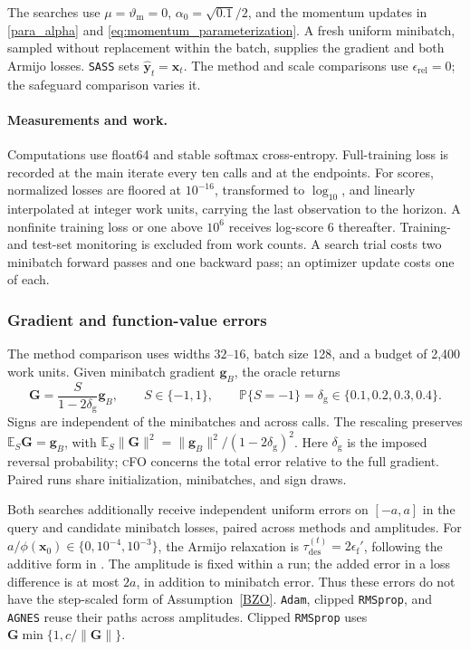 \documentclass{article}
\begin{document}
The searches use \(\mu=\vartheta_{\mathrm m}=0\),
\(\alpha_0=\sqrt{0.1}/2\), and the momentum updates in
\eqref{para_alpha} and \eqref{eq:momentum_parameterization}.
A fresh uniform minibatch, sampled without replacement within the
batch, supplies the gradient and both Armijo losses. \texttt{SASS} sets \(\hat{\bm y}_t=\bm x_t\). The method and scale comparisons
use \(\epsilon_{\mathrm{rel}}=0\); the safeguard comparison varies it.

\paragraph{Measurements and work.}
Computations use float64 and stable softmax cross-entropy.
Full-training loss is recorded at the main iterate every ten calls
and at the endpoints. For scores, normalized losses are floored at
\(10^{-16}\), transformed to \(\log_{10}\), and linearly interpolated
at integer work units, carrying the last observation to the horizon.
A nonfinite training loss or one above \(10^6\) receives log-score 6
thereafter. Training- and test-set monitoring is excluded from work
counts. A search trial costs two minibatch forward passes and one
backward pass; an optimizer update costs one of each.

\subsubsection{Gradient and function-value errors}
\label{app:exp_nn_comparison}

The method comparison uses widths \(32\)--\(16\), batch size 128,
and a budget of 2,400 work units. Given minibatch gradient \(\bm g_B\),
the oracle returns
\begin{equation}\label{eq:exp_nn_flip}
\mathbf G=\frac{S}{1-2\delta_{\mathrm g}}\bm g_B,
\qquad S\in\{-1,1\},\qquad
\mathbb P\{S=-1\}=\delta_{\mathrm g}\in\{0.1,0.2,0.3,0.4\}.
\end{equation}
Signs are independent of the minibatches and across calls.
The rescaling preserves \(\mathbb E_S\mathbf G=\bm g_B\), with
\(\mathbb E_S\|\mathbf G\|^2=\|\bm g_B\|^2/(1-2\delta_{\mathrm g})^2\).
Here \(\delta_{\mathrm g}\) is the imposed reversal probability;
\textsc{cFO} concerns the total error relative to the full gradient.
Paired runs share initialization, minibatches, and sign draws.

Both searches additionally receive independent uniform errors on
\([-a,a]\) in the query and candidate minibatch losses, paired across
methods and amplitudes. For
\(a/\phi(\bm x_0)\in\{0,10^{-4},10^{-3}\}\), the Armijo relaxation is
\(\tau_{\mathrm{des}}^{(t)}=2\epsilon_{\mathrm f}'\), following the
additive form in \cite{Xie2024}. The amplitude is fixed within a run;
the added error in a loss difference is at most \(2a\), in addition
to minibatch error. Thus these errors do not have the step-scaled
form of Assumption~\ref{BZO}. \texttt{Adam}, clipped \texttt{RMSprop},
and \texttt{AGNES} reuse their paths across amplitudes.
Clipped \texttt{RMSprop} uses \(\mathbf G\min\{1,c/\|\mathbf G\|\}\).
\end{document}
